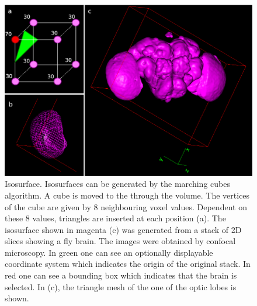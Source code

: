 \documentclass[a4paper,10pt]{article}
\begin{document}
\begin{figure}[m]
  \centering
  \includegraphics[width=\textwidth]{images/surface_montage.eps}
  \caption{Isosurface. Isosurfaces can be generated by the marching cubes algorithm. A cube is moved to the through the volume. The vertices of the cube are given by 8 neighbouring voxel values. Dependent on these 8 values, triangles are inserted at each position (a). The isosurface shown in magenta (c) was generated from a stack of 2D slices showing a fly brain. The images were obtained by confocal microscopy. In green one can see an optionally displayable coordinate system which indicates the origin of the original stack. In red one can see a bounding box which indicates that the brain is selected. In (c), the triangle mesh of the one of the optic lobes is shown.}
  \label{fig:surface}
\end{figure}
\end{document}
